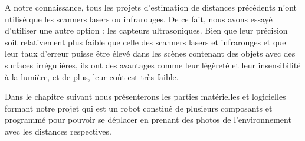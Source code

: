 A notre connaissance, tous les projets d'estimation de distances précédents
n'ont utilisé que les scanners lasers ou infrarouges. De ce fait, nous avons essayé d'utiliser
une autre option : les capteurs ultrasoniques. Bien que leur précision soit
relativement plus faible que celle des scanners lasers et infrarouges et que leur taux d'erreur
puisse être élevé dans les scènes contenant des objets avec des surfaces
irrégulières, ils ont des avantages comme leur légèreté et leur insensibilité
à la lumière, et de plus, leur coût est très faible.

Dans le chapitre suivant nous présenterons les parties matérielles et logicielles
formant notre projet qui est un robot constiué de plusieurs composants et
programmé pour pouvoir se déplacer en prenant des photos de l'environnement
avec les distances respectives.
